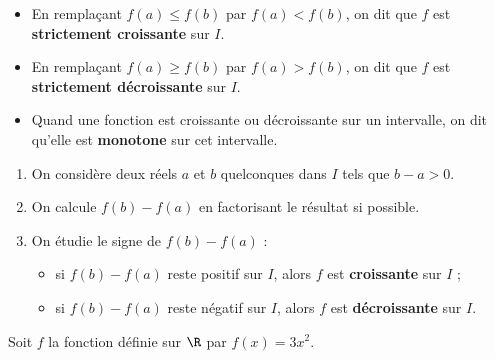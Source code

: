 \rem
\begin{itemize}
	\item En remplaçant $f(a)\le f(b)$ par $f(a)<f(b)$, on dit que $f$ est \textbf{strictement croissante} sur $I$.
	\item En remplaçant $f(a)\ge f(b)$ par $f(a)>f(b)$, on dit que $f$ est \textbf{strictement décroissante} sur $I$.
	\item Quand une fonction est croissante ou décroissante sur un intervalle, on dit qu'elle est \textbf{monotone} sur cet intervalle.
\end{itemize}

\begin{enumerate}
	\item On considère deux réels $a$ et $b$ quelconques dans $I$ tels que $b-a>0$.
	\item On calcule $f(b)-f(a)$ en factorisant le résultat si possible.
	\item On étudie le signe de $f(b)-f(a)$ :
	      \begin{itemize}
		      \item si $f(b)-f(a)$ reste positif sur $I$, alors $f$ est \textbf{croissante} sur $I$ ;
		      \item si $f(b)-f(a)$ reste négatif sur $I$, alors $f$ est \textbf{décroissante} sur $I$.
	      \end{itemize}
\end{enumerate}

\ex{}

Soit $f$ la fonction définie sur $\R$ par $f(x)=3x^2$.

